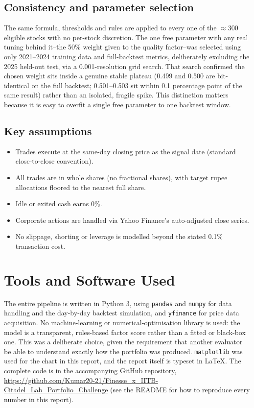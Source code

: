 \documentclass[11pt]{article}
\begin{document}
\subsection{Consistency and parameter selection}
The same formula, thresholds and rules are applied to every one of the $\approx$300 eligible stocks with no per-stock discretion. The one free parameter with any real tuning behind it--the 50\% weight given to the quality factor--was selected using only 2021--2024 training data and full-backtest metrics, deliberately excluding the 2025 held-out test, via a 0.001-resolution grid search. That search confirmed the chosen weight sits inside a genuine stable plateau (0.499 and 0.500 are bit-identical on the full backtest; 0.501--0.503 sit within 0.1 percentage point of the same result) rather than an isolated, fragile spike. This distinction matters because it is easy to overfit a single free parameter to one backtest window.

\subsection{Key assumptions}
\begin{itemize}[leftmargin=1.2em, itemsep=1pt, topsep=0.2em]
\item Trades execute at the same-day closing price as the signal date (standard close-to-close convention).
\item All trades are in whole shares (no fractional shares), with target rupee allocations floored to the nearest full share.
\item Idle or exited cash earns 0\%.
\item Corporate actions are handled via Yahoo Finance's auto-adjusted close series.
\item No slippage, shorting or leverage is modelled beyond the stated 0.1\% transaction cost.
\end{itemize}

\section{Tools and Software Used}
The entire pipeline is written in Python 3, using \texttt{pandas} and \texttt{numpy} for data handling and the day-by-day backtest simulation, and \texttt{yfinance} for price data acquisition. No machine-learning or numerical-optimisation library is used: the model is a transparent, rules-based factor score rather than a fitted or black-box one. This was a deliberate choice, given the requirement that another evaluator be able to understand exactly how the portfolio was produced. \texttt{matplotlib} was used for the chart in this report, and the report itself is typeset in \LaTeX{}. The complete code is in the accompanying GitHub repository, \url{https://github.com/Kumar20-21/Finesse_x_IITB-Citadel_Lab_Portfolio_Challenge} (see the README for how to reproduce every number in this report).
\end{document}
